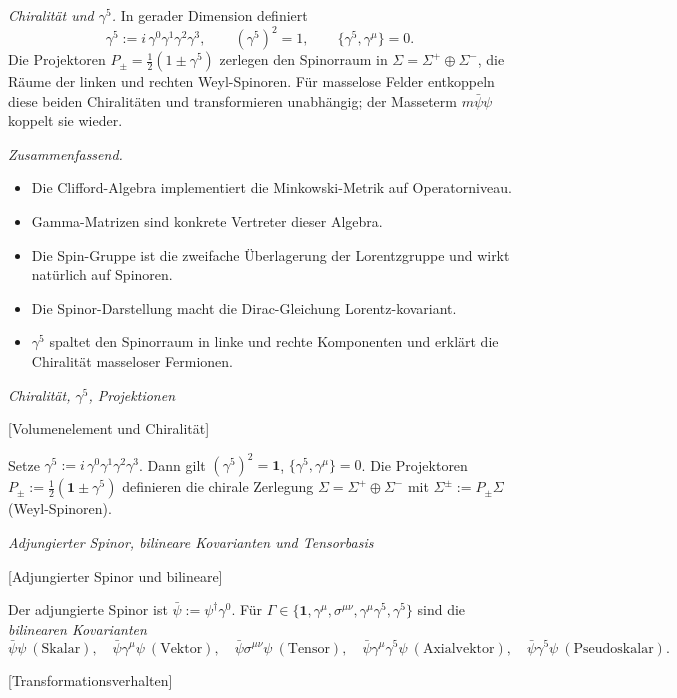 \documentclass[10pt, letterpaper]{article}
\begin{document}
\emph{Chiralität und $\gamma^5$.}
In gerader Dimension definiert
\[
\gamma^5 := i\,\gamma^0\gamma^1\gamma^2\gamma^3 ,
\qquad
(\gamma^5)^2 = 1 , \qquad
\{\gamma^5,\gamma^\mu\}=0.
\]
Die Projektoren $P_\pm = \tfrac12(1\pm\gamma^5)$
zerlegen den Spinorraum in
\(\Sigma = \Sigma^+\oplus\Sigma^-\),
die Räume der linken und rechten Weyl-Spinoren.
Für masselose Felder entkoppeln diese beiden
Chiralitäten und transformieren unabhängig;
der Masseterm \(m\bar\psi\psi\) koppelt sie wieder.

\emph{Zusammenfassend.}
\begin{itemize}
\item Die Clifford-Algebra implementiert die Minkowski-Metrik auf Operatorniveau.  
\item Gamma-Matrizen sind konkrete Vertreter dieser Algebra.  
\item Die Spin-Gruppe ist die zweifache Überlagerung der Lorentzgruppe und wirkt natürlich auf Spinoren.  
\item Die Spinor-Darstellung macht die Dirac-Gleichung Lorentz-kovariant.  
\item $\gamma^5$ spaltet den Spinorraum in linke und rechte Komponenten und erklärt die Chiralität masseloser Fermionen.  
\end{itemize}


\emph{Chiralit\"at, $\gamma^5$, Projektionen}

[Volumenelement und Chiralit\"at]

Setze $\gamma^5 := i\,\gamma^0\gamma^1\gamma^2\gamma^3$. Dann gilt $(\gamma^5)^2=\mathbf 1$, $\{\gamma^5,\gamma^\mu\}=0$.
Die Projektoren $P_\pm := \tfrac12(\mathbf 1 \pm \gamma^5)$ definieren die chirale Zerlegung $\Sigma=\Sigma^+\oplus \Sigma^-$ mit $\Sigma^\pm:=P_\pm \Sigma$ (Weyl-Spinoren).


\emph{Adjungierter Spinor, bilineare Kovarianten und Tensorbasis}

[Adjungierter Spinor und bilineare]

Der adjungierte Spinor ist $\bar\psi := \psi^\dagger \gamma^0$. Für $\Gamma \in \{\mathbf 1,\gamma^\mu,\sigma^{\mu\nu},\gamma^\mu\gamma^5,\gamma^5\}$ sind die \emph{bilinearen Kovarianten}
\[
\bar\psi \psi \ (\text{Skalar}),\quad \bar\psi\gamma^\mu\psi \ (\text{Vektor}),\quad 
\bar\psi\sigma^{\mu\nu}\psi \ (\text{Tensor}),\quad 
\bar\psi\gamma^\mu\gamma^5\psi \ (\text{Axialvektor}),\quad 
\bar\psi\gamma^5\psi \ (\text{Pseudoskalar}).
\]



[Transformationsverhalten]
\end{document}
